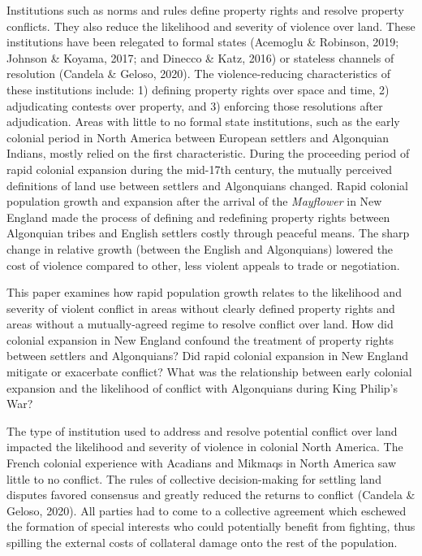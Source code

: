 \documentclass[11pt, oneside]{article}
\begin{document}
Institutions such as norms and rules define property rights and resolve property conflicts. They also reduce the likelihood and severity of violence over land. These institutions have been relegated to formal states %
(Acemoglu \& Robinson, 2019; Johnson \& Koyama, 2017; and Dinecco \& Katz, 2016) or stateless channels of resolution (Candela \& Geloso, 2020). The violence-reducing characteristics of these institutions include: 1) defining property rights over space and time, 2) adjudicating contests over property, and 3) enforcing those resolutions after adjudication. Areas with little to no formal state institutions, such as the early colonial period in North America between European settlers and Algonquian Indians, mostly relied on the first characteristic. During the proceeding period of rapid colonial expansion during the mid-17th century, the mutually perceived definitions of land use between settlers and Algonquians changed. Rapid colonial population growth and expansion after the arrival of the {\em Mayflower} in New England made the process of defining and redefining property rights between Algonquian tribes and English settlers costly through peaceful means. The sharp change in relative growth (between the English and Algonquians) lowered the cost of violence compared to other, less violent appeals to trade or negotiation. 

This paper examines how rapid population growth relates to the likelihood and severity of violent conflict in areas without clearly defined property rights and areas without a mutually-agreed regime to resolve conflict over land. How did colonial expansion in New England confound the treatment of property rights between settlers and Algonquians?  Did rapid colonial expansion in New England mitigate or exacerbate conflict?  What was the relationship between early colonial expansion and the likelihood of conflict with Algonquians during King Philip's War?

The type of institution used to address and resolve potential conflict over land impacted the likelihood and severity of violence in colonial North America. The French colonial experience with Acadians and Mikmaqs in North America saw little to no conflict. The rules of collective decision-making for settling land disputes favored consensus and greatly reduced the returns to conflict (Candela \& Geloso, 2020). All parties had to come to a collective agreement which eschewed the formation of special interests who could potentially benefit from fighting, thus spilling the external costs of collateral damage onto the rest of the population. 
\end{document}
